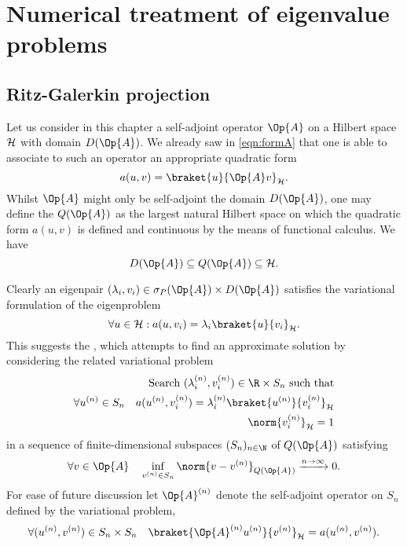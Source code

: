 \chapter{Numerical treatment of eigenvalue problems}


\section{Ritz-Galerkin projection}
Let us consider in this chapter a self-adjoint operator $\Op{A}$
on a Hilbert space $\mathcal{H}$ with domain $D(\Op{A})$.
We already saw in \eqref{eqn:formA} that one is able
to associate to such an operator an appropriate quadratic form
\[ a(u, v) = \braket{u}{\Op{A} v}_\hilbert. \]
Whilst $\Op{A}$ might only be self-adjoint the domain $D(\Op{A})$,
one may define the  $Q(\Op{A})$ as the largest
natural Hilbert space on which the quadratic form $a(u, v)$
is defined and continuous by the means of functional calculus.
We have
\[ D(\Op{A}) \subseteq Q(\Op{A}) \subseteq \hilbert. \]

Clearly an eigenpair $(\lambda_i, v_i) \in \sigma_P(\Op{A}) \times D(\Op{A})$
satisfies the variational formulation of the eigenproblem
\[ \forall u \in \hilbert: a(u, v_i) = \lambda_i \braket{u}{v_i}_\hilbert. \]
This suggests the ,
which attempts to find an approximate solution by considering
the related variational problem
\begin{align}
	\text{Search $(\lambda_i^{(n)}, v_i^{(n)}) \in \R \times S_n$ such that} \\
	\forall u^{(n)} \in S_n \quad a(u^{(n)}, v_i^{(n)})
		= \lambda_i^{(n)} \braket{u^{(n)}}{v_i^{(n)}}_\hilbert \\
	\norm{v_i^{(n)}}_\hilbert = 1
	\label{eqn:varProblem}
\end{align}
in a sequence of finite-dimensional subspaces $(S_n)_{n\in\N}$
of $Q(\Op{A})$ satisfying
\[ \forall v \in \Op{A} \quad \inf_{v^{(n)} \in S_n} \norm{v - v^{(n)}}_{Q(\Op{A})} \xrightarrow{n\to \infty} 0. \]
For ease of future discussion let $\Op{A}^{(n)}$ denote the self-adjoint
operator on $S_n$ defined by the variational problem, \ie
\[ \forall (u^{(n)}, v^{(n)}) \in S_n \times S_n \quad \braket{\Op{A}^{(n)} u^{(n)}}{v^{(n)}}_\hilbert = a(u^{(n)}, v^{(n)}). \]

